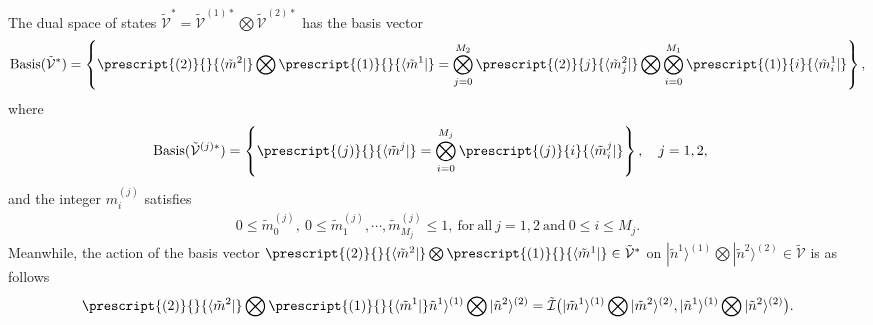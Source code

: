 \documentclass[11pt,reqno]{amsart}
\numberwithin{equation}{section}
\begin{document}
	The dual space of states  $\tilde{\mathcal{V}}^{\ast}=\tilde{\mathcal{V}}^{(1)\ast}\bigotimes\tilde{\mathcal{V}}^{(2)\ast} $ has the basis vector
	\begin{align}
		\text{Basis}	(\tilde{\mathcal{V}}^{\ast})
		=\left\{
		\prescript{(2)}{}{\langle \tilde{m}^{2}|}\bigotimes \prescript{(1)}{}{\langle \tilde{m}^{1}|}=
		\bigotimes_{j=0}^{M_{2}}\prescript{(2)}{j}{\langle \tilde{m}^{2}_j|}\bigotimes
		\bigotimes_{i=0}^{M_{1}}\prescript{(1)}{i}{\langle \tilde{m}^{1}_i|}
		\right\},
	\end{align}
	where
	\begin{align}
		\text{Basis}	(\tilde{\mathcal{V}}^{(j){\ast}})&
		=\left\{  \prescript{(j)}{}{\langle \tilde{m}^{j}|}=  \bigotimes_{i=0}^{M_{j}}\prescript{(j)}{i}{\langle \tilde{m}^{j}_i|} \right\}, \quad j=1,2,		
	\end{align}
	and the integer $m_i^{(j)}$ satisfies
	\begin{align}
		0 \le \tilde{m}_0^{(j)},  ~    0 \le \tilde{m}_1^{(j)},\cdots,  \tilde{m}_{M_j}^{(j)} \le 1, \mathrm{~for~all~} j=1,2 \mathrm{~and~}   0 \leq i \leq M_j .
	\end{align}
	Meanwhile,
	the action of the basis vector $\prescript{(2)}{}{\langle \tilde{m}^{2}|}\bigotimes \prescript{(1)}{}{\langle \tilde{m}^{1}|} \in \tilde{\mathcal{V}}^{\ast}$ on $|\tilde{n}^{1}\rangle^{(1)}\bigotimes|\tilde{n}^{2}\rangle^{(2)} \in \tilde{\mathcal{V}}$ is as follows
	\begin{align}\label{tgibm-scalar-product}
		\prescript{(2)}{}{\langle \tilde{m}^{2}|}\bigotimes \prescript{(1)}{}{\langle \tilde{m}^{1}|}
		\tilde{n}^{1}\rangle^{(1)}\bigotimes|\tilde{n}^{2}\rangle^{(2)}
		=\tilde{\mathcal{I}}
		\big(
		|\tilde{m}^{1} \rangle^{(1)}\bigotimes|\tilde{m}^{2}\rangle^{(2)}, |\tilde{n}^{1}\rangle^{(1)}\bigotimes|\tilde{n}^{2}\rangle^{(2)}
		\big).
	\end{align}
	
	
	
	
	
\end{document}
